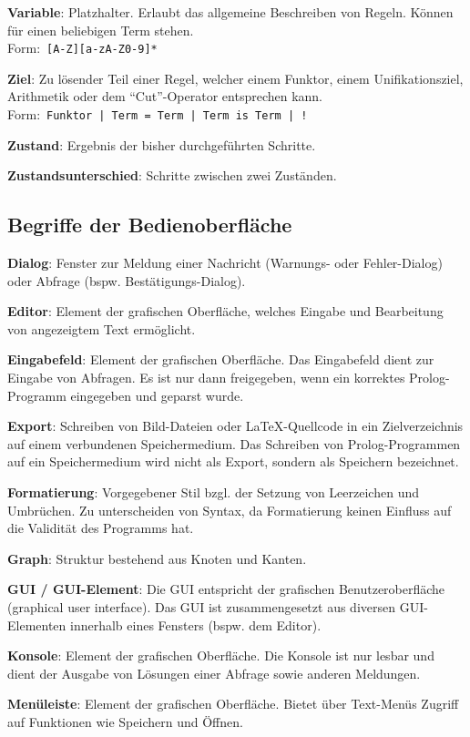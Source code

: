 \documentclass[parskip=full,11pt,twoside]{scrartcl}
\begin{document}
\textbf{Variable}:
Platzhalter. Erlaubt das allgemeine Beschreiben von Regeln. Können für einen beliebigen Term stehen.\\Form:\  \texttt{[A-Z][a-zA-Z0-9]*}

\textbf{Ziel}:
Zu lösender Teil einer Regel, welcher einem Funktor, einem Unifikationsziel, Arithmetik oder dem \enquote{Cut}-Operator entsprechen kann.\\Form:\ \texttt{Funktor | Term = Term | Term is Term | !}

\textbf{Zustand}:
Ergebnis der bisher durchgeführten Schritte.

\textbf{Zustandsunterschied}:
Schritte zwischen zwei Zuständen.

\subsection{Begriffe der Bedienoberfläche}
\textbf{Dialog}:
Fenster zur Meldung einer Nachricht (Warnungs- oder Fehler-Dialog) oder Abfrage (bspw. Bestätigungs-Dialog).

\textbf{Editor}:
Element der grafischen Oberfläche, welches Eingabe und Bearbeitung von angezeigtem Text ermöglicht.

\textbf{Eingabefeld}:
Element der grafischen Oberfläche. Das Eingabefeld dient zur Eingabe von Abfragen. Es ist nur dann freigegeben, wenn ein korrektes Prolog-Programm eingegeben und geparst wurde.

\textbf{Export}:
Schreiben von Bild-Dateien oder LaTeX-Quellcode in ein Zielverzeichnis auf einem verbundenen Speichermedium. Das Schreiben von Prolog-Programmen auf ein Speichermedium wird nicht als Export, sondern als Speichern bezeichnet.

\textbf{Formatierung}:
Vorgegebener Stil bzgl. der Setzung von Leerzeichen und Umbrüchen. Zu unterscheiden von Syntax, da Formatierung keinen Einfluss auf die Validität des Programms hat.

\textbf{Graph}:
Struktur bestehend aus Knoten und Kanten.

\textbf{GUI / GUI-Element}:
Die GUI entspricht der grafischen Benutzeroberfläche (graphical user interface). Das GUI ist zusammengesetzt aus diversen GUI-Elementen innerhalb eines Fensters (bspw. dem Editor).

\textbf{Konsole}:
Element der grafischen Oberfläche. Die Konsole ist nur lesbar und dient der Ausgabe von Lösungen einer Abfrage sowie anderen Meldungen. 

\textbf{Menüleiste}:
Element der grafischen Oberfläche. Bietet über Text-Menüs Zugriff auf Funktionen wie Speichern und Öffnen.
\end{document}
